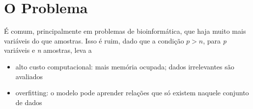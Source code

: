 \section{O Problema}

\begin{frame}

É comum, principalmente em problemas de bioinformática, que haja muito mais variáveis do que amostras. Isso é ruim, dado que a condição $ p > n $, para \textit{p} variáveis e \textit{n} amostras, leva a
\begin{itemize}
    \item alto custo computacional: mais memória ocupada; dados irrelevantes são avaliados
    \item overfitting: o modelo pode aprender relações que só existem naquele conjunto de dados
\end{itemize}

\end{frame}

\begin{frame}
\begin{table}[ht]
    \centering
    \caption{Microarray gene expression datasets, Group II}
    \label{tab:group2}
\end{table}
\end{frame}
